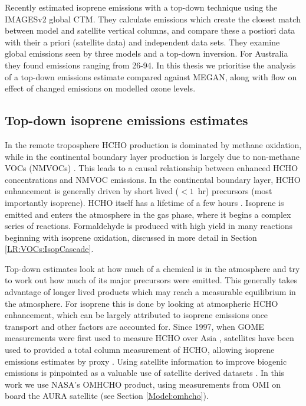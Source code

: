     Recently \textcite{Bauwens2016} estimated isoprene emissions with a top-down technique using the IMAGESv2 global CTM.
    They calculate emissions which create the closest match between model and satellite vertical columns, and compare these a postiori data with their a priori (satellite data) and independent data sets.
    They examine global emissions seen by three models and a top-down inversion.
    For Australia they found emissions ranging from 26-94\tgcpyr.
    In this thesis we prioritise the analysis of a top-down emissions estimate compared against MEGAN, along with flow on effect of changed emissions on modelled ozone levels.
  
  \subsection{Top-down isoprene emissions estimates}
    \label{BioIsop:intro:top_down_estimates}
    
    In the remote troposphere HCHO production is dominated by methane oxidation, while in the continental boundary layer production is largely due to non-methane VOCs (NMVOCs) \parencite{Abbot2003, Kefauver2014}.
    This leads to a causal relationship between enhanced HCHO concentrations and NMVOC emissions.
    In the continental boundary layer, HCHO enhancement is generally driven by short lived ($<1$~hr) precursors (most importantly isoprene).
    HCHO itself has a lifetime of a few hours \parencite{Kefauver2014}.
    Isoprene is emitted and enters the atmosphere in the gas phase, where it begins a complex series of reactions.
    Formaldehyde is produced with high yield in many reactions beginning with isoprene oxidation, discussed in more detail in Section \ref{LR:VOCs:IsopCascade}.
    
    Top-down estimates look at how much of a chemical is in the atmosphere and try to work out how much of its major precursors were emitted.
    This generally takes advantage of longer lived products which may reach a measurable equilibrium in the atmosphere.
    For isoprene this is done by looking at atmospheric HCHO enhancement, which can be largely attributed to isoprene emissions once transport and other factors are accounted for.
    Since 1997, when GOME measurements were first used to measure HCHO over Asia \parencite{Thomas1998}, satellites have been used to provided a total column measurement of HCHO, allowing isoprene emissions estimates by proxy \parencite{Palmer2001,Bauwens2016}.
    Using satellite information to improve biogenic emissions is pinpointed as a valuable use of satellite derived datasets \parencite{Streets2013}.
    In this work we use NASA's OMHCHO product, using measurements from OMI on board the AURA satellite (see Section \ref{Model:omhcho}).
    
